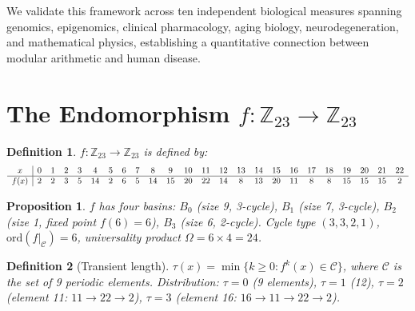 \documentclass[11pt,a4paper]{article}
\newtheorem{definition}{Definition}
\newtheorem{proposition}{Proposition}
\begin{document}
We validate this framework across ten independent biological measures spanning genomics, epigenomics, clinical pharmacology, aging biology, neurodegeneration, and mathematical physics, establishing a quantitative connection between modular arithmetic and human disease.

\section{The Endomorphism $f: \mathbb{Z}_{23} \to \mathbb{Z}_{23}$}

\begin{definition}
$f: \mathbb{Z}_{23} \to \mathbb{Z}_{23}$ is defined by:
\begin{equation}
\small
\begin{array}{c|ccccccccccccccccccccccc}
x & 0 & 1 & 2 & 3 & 4 & 5 & 6 & 7 & 8 & 9 & 10 & 11 & 12 & 13 & 14 & 15 & 16 & 17 & 18 & 19 & 20 & 21 & 22 \\
\hline
f(x) & 2 & 2 & 3 & 5 & 14 & 2 & 6 & 5 & 14 & 15 & 20 & 22 & 14 & 8 & 13 & 20 & 11 & 8 & 8 & 15 & 15 & 15 & 2
\end{array}
\end{equation}
\end{definition}

\begin{proposition}
$f$ has four basins: $B_0$ (size 9, 3-cycle), $B_1$ (size 7, 3-cycle), $B_2$ (size 1, fixed point $f(6) = 6$), $B_3$ (size 6, 2-cycle). Cycle type $(3, 3, 2, 1)$, $\mathrm{ord}(f|_\mathcal{C}) = 6$, universality product $\Omega = 6 \times 4 = 24$.
\end{proposition}

\begin{definition}[Transient length]
$\tau(x) = \min\{k \geq 0 : f^k(x) \in \mathcal{C}\}$, where $\mathcal{C}$ is the set of 9 periodic elements. Distribution: $\tau = 0$ (9 elements), $\tau = 1$ (12), $\tau = 2$ (element 11: $11 \to 22 \to 2$), $\tau = 3$ (element 16: $16 \to 11 \to 22 \to 2$).
\end{definition}
\end{document}
